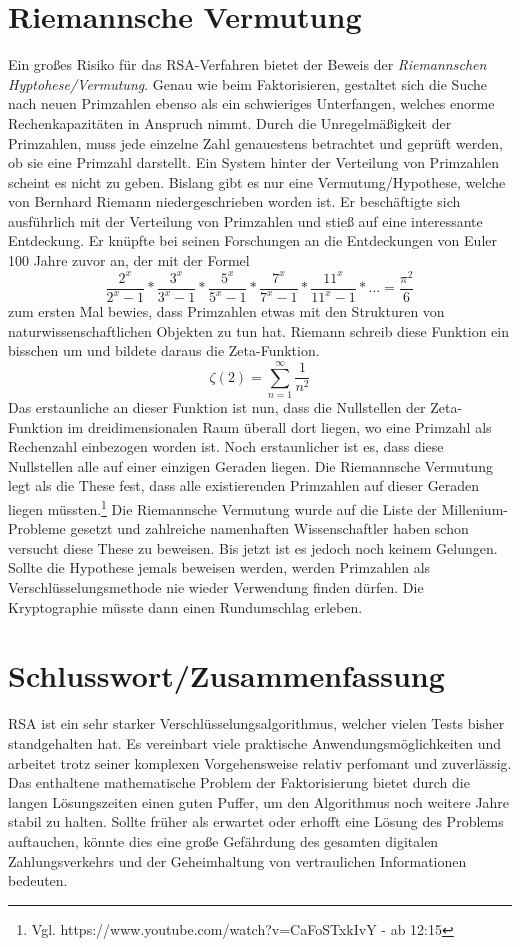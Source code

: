 \section{Riemannsche Vermutung}
Ein großes Risiko für das RSA-Verfahren bietet der Beweis der \emph{Riemannschen
Hyptohese/Vermutung}.
Genau wie beim Faktorisieren, gestaltet sich die Suche nach neuen Primzahlen ebenso als ein 
schwieriges Unterfangen, welches enorme Rechenkapazitäten in Anspruch nimmt.
Durch die Unregelmäßigkeit der Primzahlen, muss jede einzelne Zahl genauestens betrachtet
und geprüft werden, ob sie eine Primzahl darstellt. Ein System hinter der
Verteilung von Primzahlen scheint es nicht zu geben. Bislang gibt es nur eine Vermutung/Hypothese, welche von Bernhard Riemann niedergeschrieben 
worden ist. Er beschäftigte sich ausführlich mit der Verteilung von Primzahlen
und stieß auf eine interessante Entdeckung. 
Er knüpfte bei seinen Forschungen an die Entdeckungen von Euler 100 Jahre zuvor
an, der mit der Formel
\begin{displaymath}
\frac{2^x}{2^x-1}*\frac{3^x}{3^x-1}*\frac{5^x}{5^x-1}*\frac{7^x}{7^x-1}*\frac{11^x}{11^x-1}*\ldots
=\frac{\pi^2}{6}
\end{displaymath}
zum ersten Mal bewies, dass Primzahlen etwas mit den Strukturen von
naturwissenschaftlichen Objekten zu tun hat. Riemann schreib diese Funktion ein
bisschen um und bildete daraus die Zeta-Funktion. 
\begin{displaymath}
\zeta(2)=\sum_{n=1}^{\infty} \frac{1}{n^2}
\end{displaymath}
Das erstaunliche an dieser Funktion ist nun, dass die Nullstellen der
Zeta-Funktion im dreidimensionalen Raum überall dort liegen, wo eine Primzahl
als Rechenzahl einbezogen worden ist. Noch erstaunlicher ist es, dass diese Nullstellen alle auf einer
einzigen Geraden liegen. Die Riemannsche Vermutung legt als die These fest, dass
alle existierenden Primzahlen auf dieser Geraden liegen müssten.\footnote{Vgl.
  https://www.youtube.com/watch?v=CaFoSTxkIvY - ab 12:15}
\newline 
Die Riemannsche Vermutung wurde auf die Liste der Millenium-Probleme gesetzt und zahlreiche 
namenhaften Wissenschaftler haben schon versucht diese These zu beweisen. Bis jetzt ist es jedoch 
noch keinem Gelungen. Sollte die Hypothese jemals beweisen werden, werden
Primzahlen als Verschlüsselungsmethode nie wieder Verwendung finden dürfen. Die
Kryptographie müsste dann einen Rundumschlag erleben.
\section{Schlusswort/Zusammenfassung}
RSA ist ein sehr starker Verschlüsselungsalgorithmus, welcher vielen Tests
bisher standgehalten hat. Es vereinbart viele praktische Anwendungsmöglichkeiten
und arbeitet trotz seiner komplexen Vorgehensweise relativ perfomant und
zuverlässig. Das enthaltene mathematische Problem der Faktorisierung bietet durch die langen Lösungszeiten einen guten
Puffer, um den Algorithmus noch weitere Jahre stabil zu halten. Sollte früher
als erwartet oder erhofft eine Lösung des Problems auftauchen, könnte dies eine
große Gefährdung des gesamten digitalen Zahlungsverkehrs und der Geheimhaltung
von vertraulichen Informationen bedeuten.
\newpage